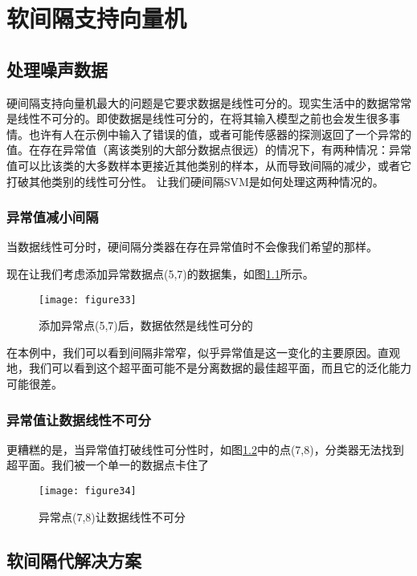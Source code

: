 \chapter{软间隔支持向量机}

\section{处理噪声数据}

硬间隔支持向量机最大的问题是它要求数据是线性可分的。现实生活中的数据常常是线性不可分的。即使数据是线性可分的，在将其输入模型之前也会发生很多事情。也许有人在示例中输入了错误的值，或者可能传感器的探测返回了一个异常的值。在存在异常值（离该类别的大部分数据点很远）的情况下，有两种情况：异常值可以比该类的大多数样本更接近其他类别的样本，从而导致间隔的减少，或者它打破其他类别的线性可分性。 让我们硬间隔SVM是如何处理这两种情况的。

\subsection{异常值减小间隔}

当数据线性可分时，硬间隔分类器在存在异常值时不会像我们希望的那样。

现在让我们考虑添加异常数据点(5,7)的数据集，如图\ref{figure33}所示。

\begin{figure}[ht]
	\centering
	\texttt{[image: figure33]}
	\caption{添加异常点(5,7)后，数据依然是线性可分的}
	\label{figure33}
\end{figure}

在本例中，我们可以看到间隔非常窄，似乎异常值是这一变化的主要原因。直观地，我们可以看到这个超平面可能不是分离数据的最佳超平面，而且它的泛化能力可能很差。

\subsection{异常值让数据线性不可分}

更糟糕的是，当异常值打破线性可分性时，如图\ref{figure34}中的点(7,8)，分类器无法找到超平面。我们被一个单一的数据点卡住了

\begin{figure}[ht]
	\centering
	\texttt{[image: figure34]}
	\caption{异常点(7,8)让数据线性不可分}
	\label{figure34}
\end{figure}


\section{软间隔代解决方案}

